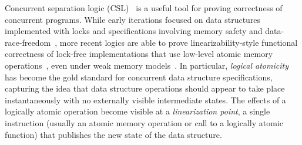 

Concurrent separation logic (CSL)~\cite{csl} is a useful tool for proving correctness of concurrent programs. While early iterations focused on data structures implemented with locks and specifications involving memory safety and data-race-freedom~\cite{gotsman,oraclesematic}, more recent logics are able to prove linearizability-style functional correctness of lock-free implementations that use low-level atomic memory operations~\cite{tada,iris}, even under weak memory models~\cite{rustbelt-relaxed}. In particular, \emph{logical atomicity}~\cite{tada} has become the gold standard for concurrent data structure specifications, capturing the idea that data structure operations should appear to take place instantaneously with no externally visible intermediate states. The effects of a logically atomic operation become visible at a \emph{linearization point}, a single instruction (usually an atomic memory operation or call to a logically atomic function) that publishes the new state of the data structure.

